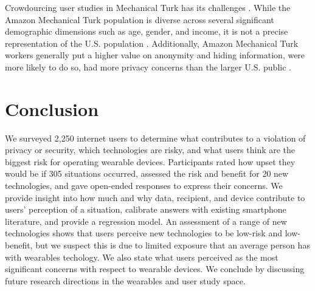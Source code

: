 \documentclass{acm_proc_article-sp}
\begin{document}
Crowdourcing user studies in Mechanical Turk has its challenges \cite{kittur2008crowdsourcing}. While the Amazon Mechanical Turk population is diverse across several significant demographic dimensions such as age, gender, and income, it is not a precise representation of the U.S. population \cite{ross2010crowdworkers}\cite{kelley2010conducting}. Additionally, Amazon Mechanical Turk workers generally put a higher value on anonymity and hiding information, were more likely to do so, had more privacy concerns than the larger U.S. public \cite{kang2014privacy}. 




\section{Conclusion}

We surveyed 2,250 internet users to determine what contributes to a violation of privacy or security, which technologies are risky, and what users think are the biggest risk for operating wearable devices. Participants rated how upset they would be if 305 situations occurred, assessed the risk and benefit for 20 new technologies, and gave open-ended responses to express their concerns. We provide insight into how much and why data, recipient, and device contribute to users' perception of a situation, calibrate answers with existing smartphone literature, and provide a regression model. An assessment of a range of new technologies shows that users perceive new technologies to be low-risk and low-benefit, but we suspect this is due to limited exposure that an average person has with wearables techology. We also state what users perceived as the most significant concerns with respect to wearable devices. We conclude by discussing future research directions in the wearables and user study space. 
\end{document}
